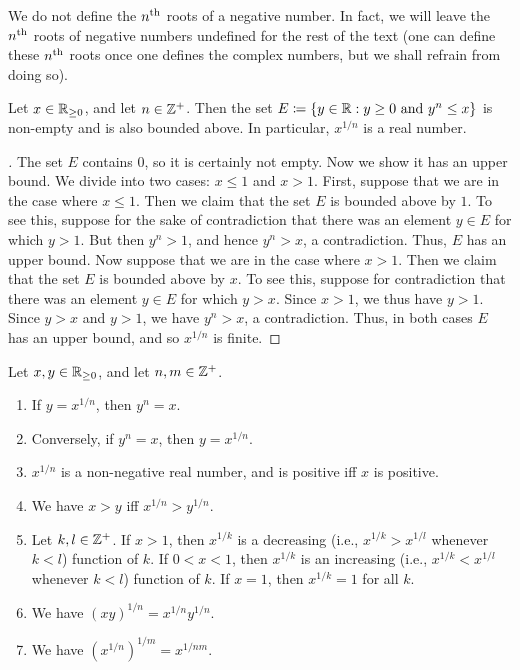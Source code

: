 \begin{note}
  We do not define the \(n^{\operatorname{th}}\) roots of a negative number.
  In fact, we will leave the \(n^{\operatorname{th}}\) roots of negative numbers undefined for the rest of the text
  (one can define these \(n^{\operatorname{th}}\) roots once one defines the complex numbers, but we shall refrain from doing so).
\end{note}

\begin{lem}\label{i:5.6.5}
  Let \(x \in \mathbb{R}_{\geq 0}\), and let \(n \in \mathbb{Z}^+\).
  Then the set \(E \coloneqq \left\lbrace y \in \mathbb{R} : y \geq 0 \text{ and } y^n \leq x\right\rbrace\) is non-empty and is also bounded above.
  In particular, \(x^{1 / n}\) is a real number.
\end{lem}

\begin{proof}[]
  The set \(E\) contains \(0\), so it is certainly not empty.
  Now we show it has an upper bound.
  We divide into two cases: \(x \leq 1\) and \(x > 1\).
  First, suppose that we are in the case where \(x \leq 1\).
  Then we claim that the set \(E\) is bounded above by \(1\).
  To see this, suppose for the sake of contradiction that there was an element \(y \in E\) for which \(y > 1\).
  But then \(y^n > 1\), and hence \(y^n > x\), a contradiction.
  Thus, \(E\) has an upper bound.
  Now suppose that we are in the case where \(x > 1\).
  Then we claim that the set \(E\) is bounded above by \(x\).
  To see this, suppose for contradiction that there was an element \(y \in E\) for which \(y > x\).
  Since \(x > 1\), we thus have \(y > 1\).
  Since \(y > x\) and \(y > 1\), we have \(y^n > x\), a contradiction.
  Thus, in both cases \(E\) has an upper bound, and so \(x^{1 / n}\) is finite.
\end{proof}

\begin{lem}\label{i:5.6.6}
  Let \(x, y \in \mathbb{R}_{\geq 0}\), and let \(n, m \in \mathbb{Z}^+\).
  \begin{enumerate}
    \item If \(y = x^{1 / n}\), then \(y^n = x\).
    \item Conversely, if \(y^n = x\), then \(y = x^{1 / n}\).
    \item \(x^{1 / n}\) is a non-negative real number, and is positive iff \(x\) is positive.
    \item We have \(x > y\) iff \(x^{1 / n} > y^{1 / n}\).
    \item Let \(k, l \in \mathbb{Z}^+\).
          If \(x > 1\), then \(x^{1 / k}\) is a decreasing (i.e., \(x^{1 / k} > x^{1 / l}\) whenever \(k < l\)) function of \(k\).
          If \(0 < x < 1\), then \(x^{1 / k}\) is an increasing (i.e., \(x^{1 / k} < x^{1 / l}\) whenever \(k < l\)) function of \(k\).
          If \(x = 1\), then \(x^{1 / k} = 1\) for all \(k\).
    \item We have \((xy)^{1 / n} = x^{1 / n} y^{1 / n}\).
    \item We have \((x^{1 / n})^{1 / m} = x^{1 / nm}\).
  \end{enumerate}
\end{lem}

